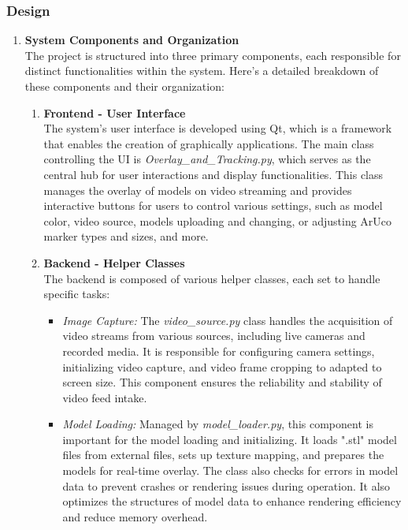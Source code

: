 \documentclass[12pt]{article}
\begin{document}
\subsubsection{Design}
\begin{enumerate}
      \item \textbf{System Components and Organization}
            \\The project is structured into three primary components, each responsible for distinct functionalities within the system.
            Here’s a detailed breakdown of these components and their organization:
            \begin{enumerate}
                  \item \textbf{Frontend - User Interface}
                        \\The system's user interface is developed using Qt, which is a framework that enables the creation of graphically applications.
                        The main class controlling the UI is \emph{Overlay\_and\_Tracking.py}, which serves as the central hub for user interactions and display functionalities.
                        This class manages the overlay of models on video streaming and provides interactive buttons for users to control various settings, such as model color,
                        video source, models uploading and changing, or adjusting ArUco marker types and sizes, and more.
                  \item \textbf{Backend - Helper Classes}
                        \\The backend is composed of various helper classes, each set to handle specific tasks:
                        \begin{itemize}
                              \item \textit{Image Capture:} The \emph{video\_source.py} class handles the acquisition of video streams from various sources,
                                    including live cameras and recorded media. It is responsible for configuring camera settings, initializing video capture, and video frame cropping to adapted to screen size. This component ensures the reliability and stability of video feed intake.

                              \item \textit{Model Loading:} Managed by \emph{model\_loader.py}, this component is important for the model loading and initializing. It loads ".stl" model files from external files, sets up texture mapping, and prepares the models for real-time overlay. The class also checks for errors in model data to prevent crashes or rendering issues during operation. It also optimizes the structures of model data to enhance rendering efficiency and reduce memory overhead.


\end{itemize}
\end{enumerate}
\end{enumerate}
\end{document}
